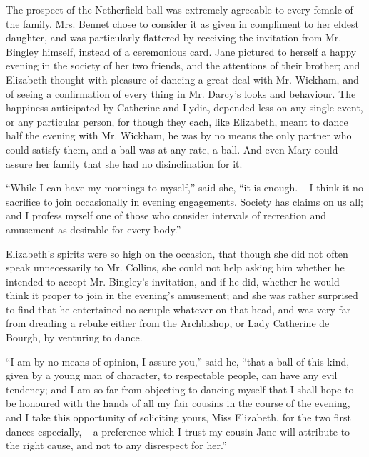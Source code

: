 The prospect of the Netherfield ball was extremely
agreeable to every female of the family. Mrs. Bennet
chose to consider it as given in compliment to her eldest
daughter, and was particularly flattered by receiving the
invitation from Mr. Bingley himself, instead of a ceremonious
card. Jane pictured to herself a happy evening
in the society of her two friends, and the attentions of their
brother; and Elizabeth thought with pleasure of dancing
a great deal with Mr. Wickham, and of seeing a confirmation
of every thing in Mr. Darcy’s looks and behaviour.
The happiness anticipated by Catherine and Lydia,
depended less on any single event, or any particular
person, for though they each, like Elizabeth, meant to
dance half the evening with Mr. Wickham, he was by no
means the only partner who could satisfy them, and a ball
was at any rate, a ball. And even Mary could assure her
family that she had no disinclination for it.

“While I can have my mornings to myself,” said she,
“it is enough. -- I think it no sacrifice to join occasionally
in evening engagements. Society has claims on us all;
and I profess myself one of those who consider intervals
of recreation and amusement as desirable for every body.”

Elizabeth’s spirits were so high on the occasion, that
though she did not often speak unnecessarily to Mr. Collins,
she could not help asking him whether he intended to
accept Mr. Bingley’s invitation, and if he did, whether
he would think it proper to join in the evening’s amusement;
and she was rather surprised to find that he entertained
no scruple whatever on that head, and was very
far from dreading a rebuke either from the Archbishop,
or Lady Catherine de Bourgh, by venturing to dance.

“I am by no means of opinion, I assure you,” said he,
“that a ball of this kind, given by a young man of character,
to respectable people, can have any evil tendency;
and I am so far from objecting to dancing myself that
I shall hope to be honoured with the hands of all my fair
cousins in the course of the evening, and I take this opportunity
of soliciting yours, Miss Elizabeth, for the two first
dances especially, -- a preference which I trust my cousin
Jane will attribute to the right cause, and not to any
disrespect for her.”

